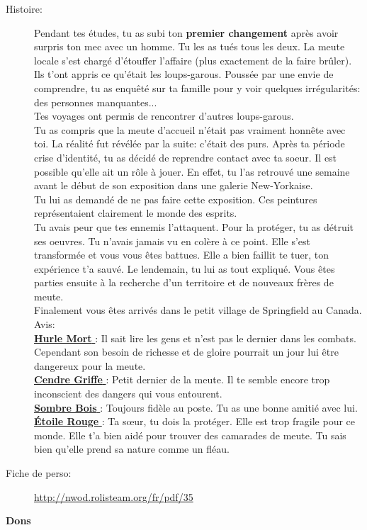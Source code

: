 \documentclass[oneside,12pt]{book}
\newcommand{\Lynn}{\textbf{Étoile Rouge} }
\newcommand{\Luke}{\textbf{Cendre Griffe} }
\newcommand{\Peter}{\textbf{Hurle Mort} }
\newcommand{\Leonard}{\textbf{Sombre Bois} }
\begin{document}
\begin{flushleft}
\begin{description}
\item[Histoire:]{ 
Pendant tes études, tu as subi ton \textbf{premier changement} après avoir surpris ton mec avec un homme. Tu les as tués tous les deux.
La meute locale s'est chargé d'étouffer l'affaire (plus exactement de la faire brûler).\\
Ils t'ont appris ce qu'était les loups-garous. Poussée par une envie de comprendre, tu as enquêté sur ta famille pour y voir quelques irrégularités: des personnes manquantes...\\
Tes voyages ont permis de rencontrer d'autres loups-garous.\\
Tu as compris que la meute d'accueil n'était pas vraiment honnête avec toi. La réalité fut révélée par la suite: c'était des purs.
Après ta période crise d'identité, tu as décidé de reprendre contact avec ta soeur. Il est possible qu'elle ait un rôle à jouer.
En effet, tu l'as retrouvé une semaine avant le début de son exposition dans une galerie New-Yorkaise.\\
Tu lui as demandé de ne pas faire cette exposition. Ces peintures représentaient clairement le monde des esprits.\\
Tu avais peur que tes ennemis l'attaquent. Pour la protéger, tu as détruit ses oeuvres. Tu n'avais jamais vu en colère à ce point.
Elle s'est transformée et vous vous êtes battues. Elle a bien faillit te tuer, ton expérience t'a sauvé. Le lendemain, tu lui as tout expliqué.
Vous êtes parties ensuite à la recherche d'un territoire et de nouveaux frères de meute.\\
Finalement vous êtes arrivés dans le petit village de Springfield au Canada.  \\
Avis:\\
\underline{\Peter} : Il sait lire les gens et n'est pas le dernier dans les combats. Cependant son besoin de richesse et de gloire pourrait un jour lui être dangereux pour la meute. \\
\underline{\Luke} : Petit dernier de la meute. Il te semble encore trop inconscient des dangers qui vous entourent.\\
\underline{\Leonard} : Toujours fidèle au poste. Tu as une bonne amitié avec lui.\\
\underline{\Lynn}: Ta sœur, tu dois la protéger. Elle est trop fragile pour ce monde. Elle t'a bien aidé pour trouver des camarades de meute. Tu sais bien qu'elle prend sa nature comme un fléau.\\
}
\item[Fiche de perso:]{\href{http://nwod.rolisteam.org/fr/pdf/35}{http://nwod.rolisteam.org/fr/pdf/35}}
\end{description}
\clearpage
\textbf{\large Dons} 
\vspace{0.5cm}


\end{flushleft}
\end{document}
